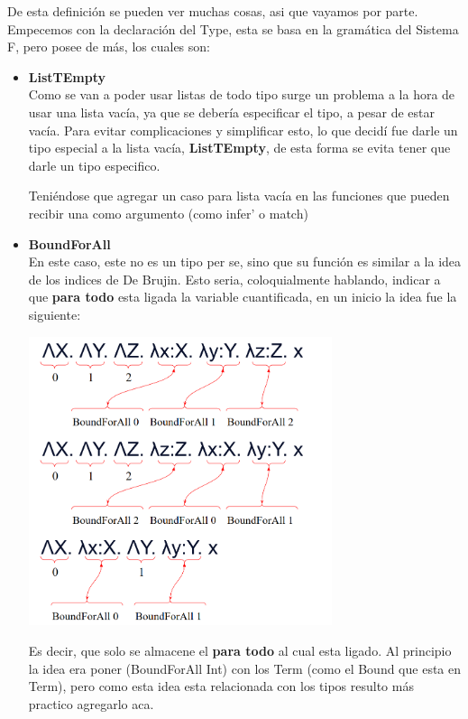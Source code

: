 \documentclass[12pt, titlepage, a4paper]{article}
\begin{document}
De esta definición se pueden ver muchas cosas, asi que vayamos por parte. Empecemos con la declaración del Type, esta se basa en la gramática del Sistema F, pero 
posee  de más, los cuales son: 

\begin{itemize}[label=$\bullet$]
  \item {\textbf{ListTEmpty}\\
  Como se van a poder usar listas de todo tipo surge un problema a la hora de usar una lista vacía, ya que se debería especificar el tipo, 
  a pesar de estar vacía. 
  Para evitar complicaciones y simplificar esto, lo que decidí fue darle un tipo especial a la lista vacía, \textbf{ListTEmpty}, de esta forma se evita 
  tener que darle un tipo especifico.
  
  Teniéndose que agregar un caso  para lista vacía en las funciones que pueden recibir una como argumento (como infer' o match)
  }

  \item {\textbf{BoundForAll}\\
  En este caso, este no es un tipo per se, sino que su función es similar a la idea 
  de los indices de De Brujin. Esto seria, coloquialmente hablando, indicar a que \textbf{para todo} esta ligada la variable cuantificada, 
  en un inicio la idea fue la siguiente:

  \begin{center}
      \includegraphics[width=0.7\textwidth]{Imagenes/EjemploBoundForAll.png}
  \end{center}

  Es decir, que solo se almacene el \textbf{para todo} al cual esta ligado. 
  Al principio la idea era poner (BoundForAll Int) con los Term (como el Bound que esta en Term), pero como esta idea esta relacionada con 
  los tipos resulto más practico agregarlo aca.\\
  
}
\end{itemize}
\end{document}
